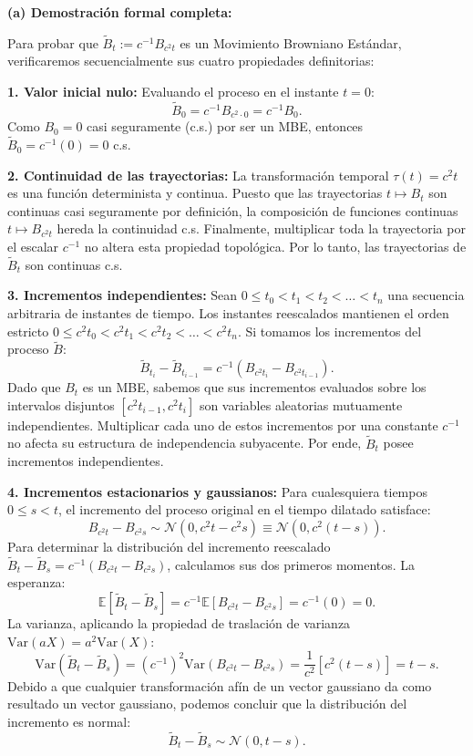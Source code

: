 \documentclass[11pt, letterpaper]{article}
\begin{document}
\begin{solucion}
    \vspace{3mm}
    \textbf{(a) Demostración formal completa:}
    
    Para probar que $\tilde{B}_t := c^{-1} B_{c^2 t}$ es un Movimiento Browniano Estándar, verificaremos secuencialmente sus cuatro propiedades definitorias:
    
    \textbf{1. Valor inicial nulo:}
    Evaluando el proceso en el instante $t = 0$:
    $$ \tilde{B}_0 = c^{-1} B_{c^2 \cdot 0} = c^{-1} B_0. $$
    Como $B_0 = 0$ casi seguramente (c.s.) por ser un MBE, entonces $\tilde{B}_0 = c^{-1}(0) = 0$ c.s.

    \textbf{2. Continuidad de las trayectorias:}
    La transformación temporal $\tau(t) = c^2 t$ es una función determinista y continua. Puesto que las trayectorias $t \mapsto B_t$ son continuas casi seguramente por definición, la composición de funciones continuas $t \mapsto B_{c^2 t}$ hereda la continuidad c.s. Finalmente, multiplicar toda la trayectoria por el escalar $c^{-1}$ no altera esta propiedad topológica. Por lo tanto, las trayectorias de $\tilde{B}_t$ son continuas c.s.

    \textbf{3. Incrementos independientes:}
    Sean $0 \le t_0 < t_1 < t_2 < \dots < t_n$ una secuencia arbitraria de instantes de tiempo. Los instantes reescalados mantienen el orden estricto $0 \le c^2 t_0 < c^2 t_1 < c^2 t_2 < \dots < c^2 t_n$.
    Si tomamos los incrementos del proceso $\tilde{B}$:
    $$ \tilde{B}_{t_i} - \tilde{B}_{t_{i-1}} = c^{-1} \left( B_{c^2 t_i} - B_{c^2 t_{i-1}} \right). $$
    Dado que $B_t$ es un MBE, sabemos que sus incrementos evaluados sobre los intervalos disjuntos $[c^2 t_{i-1}, c^2 t_i]$ son variables aleatorias mutuamente independientes. Multiplicar cada uno de estos incrementos por una constante $c^{-1}$ no afecta su estructura de independencia subyacente. Por ende, $\tilde{B}_t$ posee incrementos independientes.

    \textbf{4. Incrementos estacionarios y gaussianos:}
    Para cualesquiera tiempos $0 \le s < t$, el incremento del proceso original en el tiempo dilatado satisface:
    $$ B_{c^2 t} - B_{c^2 s} \sim \mathcal{N}(0, c^2 t - c^2 s) \equiv \mathcal{N}(0, c^2(t-s)). $$
    Para determinar la distribución del incremento reescalado $\tilde{B}_t - \tilde{B}_s = c^{-1} (B_{c^2 t} - B_{c^2 s})$, calculamos sus dos primeros momentos.
    La esperanza:
    $$ \mathbb{E}[\tilde{B}_t - \tilde{B}_s] = c^{-1} \mathbb{E}[B_{c^2 t} - B_{c^2 s}] = c^{-1}(0) = 0. $$
    La varianza, aplicando la propiedad de traslación de varianza $\text{Var}(aX) = a^2 \text{Var}(X)$:
    $$ \text{Var}(\tilde{B}_t - \tilde{B}_s) = (c^{-1})^2 \text{Var}(B_{c^2 t} - B_{c^2 s}) = \frac{1}{c^2} \left[ c^2(t-s) \right] = t-s. $$
    Debido a que cualquier transformación afín de un vector gaussiano da como resultado un vector gaussiano, podemos concluir que la distribución del incremento es normal:
    $$ \tilde{B}_t - \tilde{B}_s \sim \mathcal{N}(0, t-s). $$
    

\end{solucion}
\end{document}

